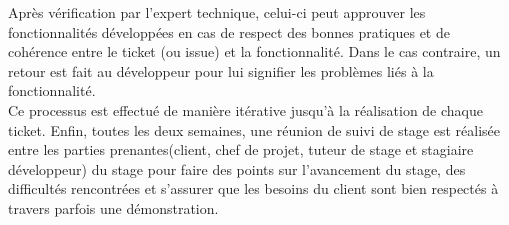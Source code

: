 		Après vérification par l’expert technique, celui-ci peut approuver les fonctionnalités développées en cas de respect des bonnes pratiques et de cohérence entre le ticket (ou issue) et la fonctionnalité. Dans le cas contraire, un retour est fait au développeur pour lui signifier les problèmes liés à la fonctionnalité.\\
		
		Ce processus est effectué de manière itérative jusqu’à la réalisation de chaque ticket. Enfin, toutes les deux semaines, une réunion de suivi de stage est réalisée entre les parties prenantes(client, chef de projet, tuteur de stage et stagiaire développeur) du stage pour faire des points sur l’avancement du stage, des difficultés rencontrées et s’assurer que les besoins du client sont bien respectés à travers parfois une démonstration.
		
		